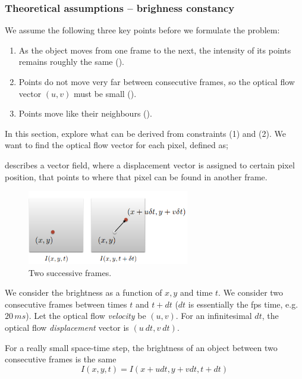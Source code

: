 \documentclass[a4paper]{article}
\begin{document}
\subsubsection{Theoretical assumptions -- brighness constancy}


We assume the following three key points before we formulate the problem:
\begin{enumerate}
    \item As the object moves from one frame to the next, the intensity of its points remains roughly the same ().
    \item Points do not move very far between consecutive frames, so the optical flow vector $(u,v)$ must be small ().
    \item Points move like their neighbours ().
\end{enumerate}
In this section, explore what can be derived from constraints (1) and (2). We want to find the optical flow vector for each pixel, defined as;
\begin{definition}
 describes a vector field, where a displacement vector is assigned to certain pixel position, that points to where that pixel can be found in another frame.
\end{definition}
\begin{figure}[H]
    \centering
    \includegraphics[height=3.25cm]{img/opt_flow/small_motion.PNG}
    \caption{Two successive frames.}
\end{figure}
We consider the brightness as a function of $x,y$ and time $t$. We consider two consecutive frames between times $t$ and $t+dt$ ($dt$ is essentially the fps time, e.g. $20 \, ms$). Let the optical flow \textit{velocity} be $(u,v)$. For an infinitesimal $dt$, the optical flow \textit{displacement} vector is $(u\:dt,v\:dt)$.
\begin{definition}
For a really small space-time step, the brightness of an object between two consecutive frames is the same
\begin{equation}
    I(x,y,t) = I(x+udt, y+vdt,t+dt )
    \label{eq:brightness_const}
\end{equation}
\end{definition}
\end{document}
